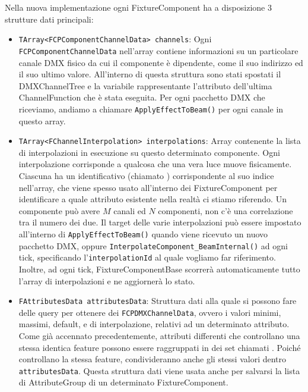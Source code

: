 \documentclass[main.tex]{subfiles}
\begin{document}
Nella nuova implementazione ogni FixtureComponent ha a disposizione 3 strutture dati principali: 
\begin{itemize}
    \item \lstinline{TArray<FCPComponentChannelData> channels}: Ogni \lstinline{FCPComponentChannelData} nell'array contiene informazioni su un particolare canale DMX fisico da cui il componente è dipendente, come il suo indirizzo ed il suo ultimo valore. All'interno di questa struttura sono stati spostati il DMXChannelTree e la variabile rappresentante l'attributo dell'ultima ChannelFunction che è stata eseguita. Per ogni pacchetto DMX che riceviamo, andiamo a chiamare \lstinline{ApplyEffectToBeam()} per ogni canale in questo array.
    \item \lstinline{TArray<FChannelInterpolation> interpolations}: Array contenente la lista di interpolazioni in esecuzione su questo determinato componente. Ogni interpolazione corrisponde a qualcosa che una vera luce muove fisicamente. Ciascuna ha un identificativo (chiamato ) corrispondente al suo indice nell'array, che viene spesso usato all'interno dei FixtureComponent per identificare a quale attributo esistente nella realtà ci stiamo riferendo. Un componente può avere $M$ canali ed $N$ componenti, non c'è una correlazione tra il numero dei due. Il target delle varie interpolazioni può essere impostato all'interno di \lstinline{ApplyEffectToBeam()} quando viene ricevuto un nuovo pacchetto DMX, oppure \lstinline{InterpolateComponent_BeamInternal()} ad ogni tick, specificando l'\lstinline{interpolationId} al quale vogliamo far riferimento. Inoltre, ad ogni tick, FixtureComponentBase scorrerà automaticamente tutto l'array di interpolazioni e ne aggiornerà lo stato.
    \item \lstinline{FAttributesData attributesData}: Struttura dati alla quale si possono fare delle query per ottenere dei \lstinline{FCPDMXChannelData}, ovvero i valori minimi, massimi, default, e di interpolazione, relativi ad un determinato attributo. Come già accennato precedentemente, attributi differenti che controllano una stessa identica feature possono essere raggruppati in dei set chiamati . Poiché controllano la stessa feature, condivideranno anche gli stessi valori dentro \lstinline{attributesData}. Questa struttura dati viene usata anche per salvarsi la lista di AttributeGroup di un determinato FixtureComponent.
\end{itemize}

\end{document}
